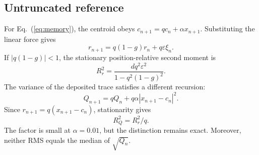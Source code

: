 \subsection{Untruncated reference}
For Eq.~(\ref{eq:memory}), the centroid obeys
$c_{n+1}=qc_n+\alpha x_{n+1}$. Substituting the linear force gives
\begin{equation}
r_{n+1}=q(1-g)r_n+q\varepsilon\xi_n.
\label{eq:relative_mode}
\end{equation}
If $|q(1-g)|<1$, the stationary position-relative second moment is
\begin{equation}
R_r^2=\frac{d q^2\varepsilon^2}{1-q^2(1-g)^2}.
\label{eq:position_radius}
\end{equation}
The variance of the deposited trace satisfies a different recursion:
\begin{equation}
Q_{n+1}=qQ_n+q\alpha|x_{n+1}-c_n|^2.
\label{eq:cloud_recursion}
\end{equation}
Since $r_{n+1}=q(x_{n+1}-c_n)$, stationarity gives
\begin{equation}
R_Q^2=R_r^2/q.
\label{eq:cloud_radius}
\end{equation}
The factor is small at $\alpha=0.01$, but the distinction remains exact.
Moreover, neither RMS equals the median of $\sqrt{Q_n}$.

